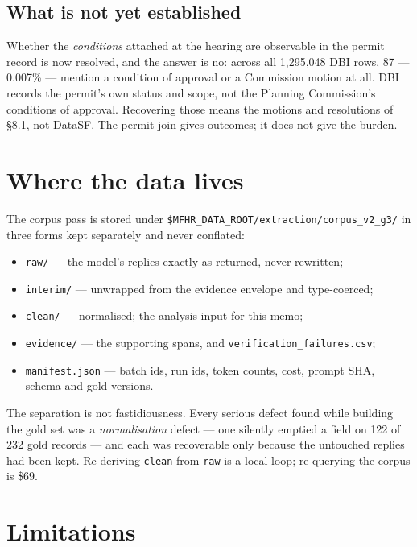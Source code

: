 \documentclass[11pt]{article}
\begin{document}
\subsection{What is not yet established}

Whether the \emph{conditions} attached at the hearing are observable in the permit record is
now resolved, and the answer is no: across all 1{,}295{,}048 DBI rows, 87 --- 0.007\% ---
mention a condition of approval or a Commission motion at all. DBI records the permit's own
status and scope, not the Planning Commission's conditions of approval. Recovering those means the motions and resolutions of \S8.1, not
DataSF. The permit join gives outcomes; it does not give the burden.

\section{Where the data lives}

The corpus pass is stored under \verb|$MFHR_DATA_ROOT/extraction/corpus_v2_g3/| in three forms
kept separately and never conflated:

\begin{itemize}
\item \texttt{raw/} --- the model's replies exactly as returned, never rewritten;
\item \texttt{interim/} --- unwrapped from the evidence envelope and type-coerced;
\item \texttt{clean/} --- normalised; the analysis input for this memo;
\item \texttt{evidence/} --- the supporting spans, and \texttt{verification\_failures.csv};
\item \texttt{manifest.json} --- batch ids, run ids, token counts, cost, prompt SHA, schema and
gold versions.
\end{itemize}

The separation is not fastidiousness. Every serious defect found while building the gold set
was a \emph{normalisation} defect --- one silently emptied a field on 122 of 232 gold records
--- and each was recoverable only because the untouched replies had been kept. Re-deriving
\texttt{clean} from \texttt{raw} is a local loop; re-querying the corpus is \$69.

\section{Limitations}
\end{document}
